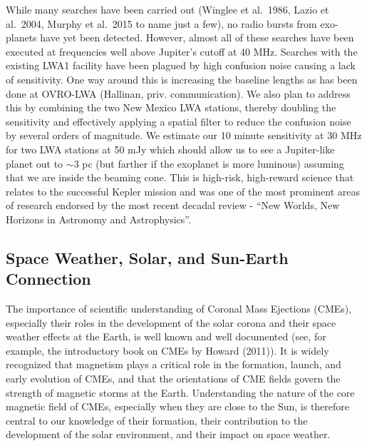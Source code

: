 \documentclass[11pt]{article}
\begin{document}
While many searches have been carried out (Winglee et al.\ 1986, Lazio
et al.\ 2004, Murphy et al.\ 2015 to name just a few), no radio bursts
from exo-planets have yet been detected.  However, almost all of these
searches have been executed at frequencies well above Jupiter's cutoff
at 40 MHz.  Searches with the existing LWA1 facility have been plagued
by high confusion noise causing a lack of sensitivity.  One way around this is increasing the baseline lengths as has been done at OVRO-LWA (Hallinan, priv. communication).  We also plan to address
this by combining the two New Mexico LWA stations, thereby doubling the sensitivity
and effectively applying a 
spatial filter to reduce the confusion noise by several orders of
magnitude.  We estimate our 10 minute
sensitivity at 30 MHz for two LWA stations at 50 mJy which should 
allow us to see a Jupiter-like planet out to $\sim$3 pc (but farther if
the exoplanet is more luminous) assuming that we are
inside the beaming cone. This is high-risk, high-reward science that
relates to the successful Kepler mission and was one of the most
prominent areas of research endorsed by the most recent decadal 
review - ``New Worlds, New Horizons in Astronomy and Astrophysics''.


\vspace{-0.5cm}
\subsection{Space Weather, Solar, and Sun-Earth Connection}
\vspace{-0.25cm}

The importance of scientific understanding of Coronal Mass Ejections (CMEs), especially their roles in the development of the solar corona and their space weather effects at the Earth, is well known and well documented (see, for example, the introductory book on CMEs by Howard (2011)). It is widely recognized that magnetism plays a critical role in the formation, launch, and early evolution of CMEs, and that the orientations of CME fields govern the strength of magnetic storms at the Earth. Understanding the nature of the core magnetic field of CMEs, especially when they are close to the Sun, is therefore central to our knowledge of their formation, their contribution to the development of the solar environment, and their impact on space weather.
\end{document}
